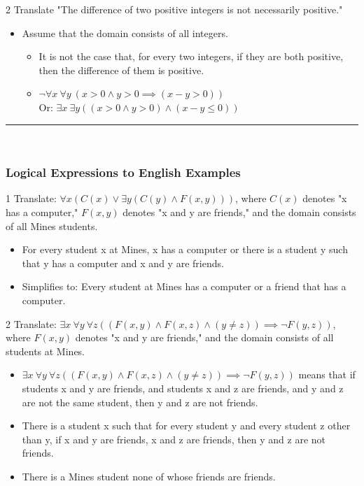 \documentclass[12pt, letterpaper]{article}
\newcommand{\exheader}[1][ex]{{\tiny{#1}\normalsize}}
\newcommand{\horizline}[0]{\noindent\rule{\textwidth}{1pt}\\}
\begin{document}
\exheader[2] Translate "The difference of two positive integers is not necessarily positive."
\begin{itemize}[leftmargin=*, label={}]
	\item Assume that the domain consists of all integers.
	\begin{itemize}
		\item It is not the case that, for every two integers, if they are both positive, then the difference of them is positive.
		\item $\neg \forall x \ \forall y \ (x > 0 \land y > 0 \implies (x - y > 0))$ \\ Or: $\exists x \ \exists y ((x > 0 \land y > 0) \land (x-y \le 0))$
	\end{itemize}
\end{itemize}

\bigbreak
\horizline

\subsubsection*{Logical Expressions to English Examples}
\bigbreak
\exheader[1] Translate: $\forall x (C(x) \lor \exists y (C(y) \land F(x,y)))$, where $C(x)$ denotes "x has a computer," $F(x,y)$ denotes "x and y are friends," and the domain consists of all Mines students.
\begin{itemize}[leftmargin=0.3cm, label={}]
	\item For every student x at Mines, x has a computer or there is a student y such that y has a computer and x and y are friends.
	\item Simplifies to: Every student at Mines has a computer or a friend that has a computer.
\end{itemize}

\exheader[2] Translate: $\exists x \ \forall y \ \forall z ((F(x,y) \land F(x,z) \land (y \ne z)) \implies \neg F(y,z))$, where $F(x,y)$ denotes "x and y are friends," and the domain consists of all students at Mines.
\begin{itemize}[leftmargin=0.3cm, label={}]
	\item $\exists x \ \forall y \ \forall z ((F(x,y) \land F(x,z) \land (y \ne z)) \implies \neg F(y,z))$ means that if students x and y are friends, and students x and z are friends, and y and z are not the same student, then y and z are not friends.
	\item There is a student x such that for every student y and every student z other than y, if x and y are friends, x and z are friends, then y and z are not friends.
	\item There is a Mines student none of whose friends are friends.
\end{itemize}
\end{document}
